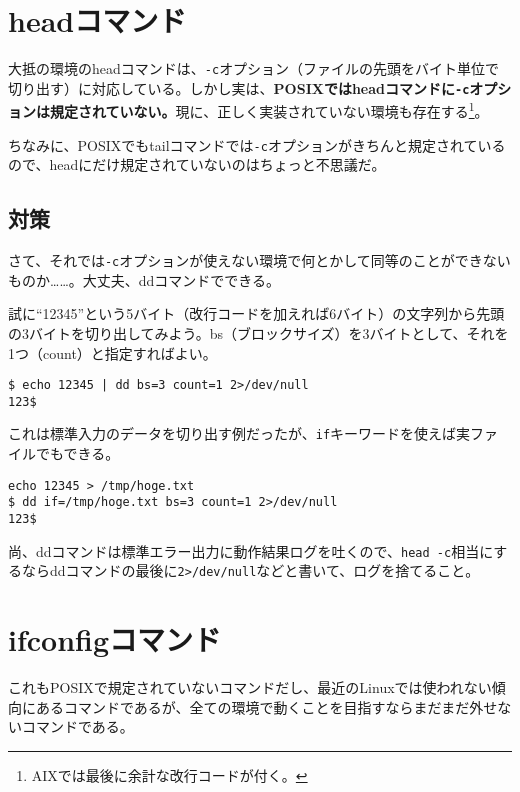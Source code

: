 \section{headコマンド}

大抵の環境のheadコマンドは、\verb|-c|オプション（ファイルの先頭をバイト単位で切り出す）に対応している。しかし実は、\textbf{POSIXではheadコマンドに\verb|-c|オプションは規定されていない。}現に、正しく実装されていない環境も存在する\footnote{AIXでは最後に余計な改行コードが付く。}。

ちなみに、POSIXでもtailコマンドでは\verb|-c|オプションがきちんと規定されているので、headにだけ規定されていないのはちょっと不思議だ。

\subsection*{対策}

さて、それでは\verb|-c|オプションが使えない環境で何とかして同等のことができないものか……。大丈夫、ddコマンドでできる。

試に``12345''という5バイト（改行コードを加えれば6バイト）の文字列から先頭の3バイトを切り出してみよう。bs（ブロックサイズ）を3バイトとして、それを1つ（count）と指定すればよい。

\begin{screen}
	\verb!$ echo 12345 | dd bs=3 count=1 2>/dev/null! \return \\
	\verb|123$ |
\end{screen}

これは標準入力のデータを切り出す例だったが、\verb|if|キーワードを使えば実ファイルでもできる。

\begin{screen}
	\verb|echo 12345 > /tmp/hoge.txt| \return \\
	\verb|$ dd if=/tmp/hoge.txt bs=3 count=1 2>/dev/null| \return \\
	\verb|123$ |
\end{screen}

尚、ddコマンドは標準エラー出力に動作結果ログを吐くので、\verb|head -c|相当にするならddコマンドの最後に\verb|2>/dev/null|などと書いて、ログを捨てること。

\section{ifconfigコマンド}

これもPOSIXで規定されていないコマンドだし、最近のLinuxでは使われない傾向にあるコマンドであるが、全ての環境で動くことを目指すならまだまだ外せないコマンドである。

